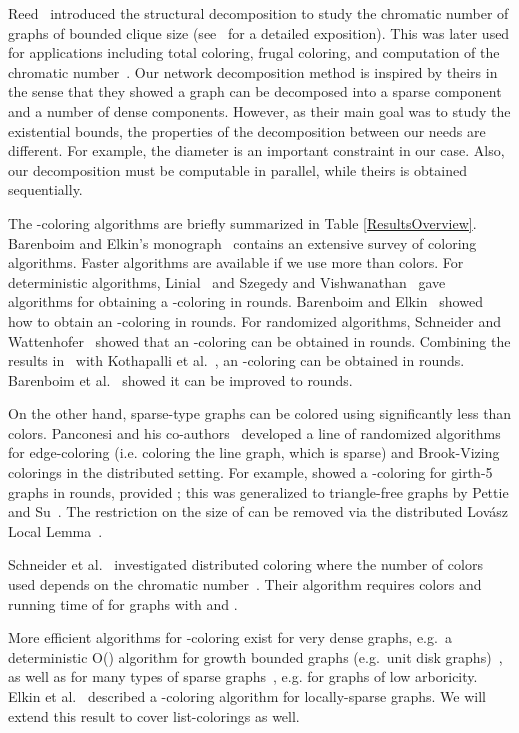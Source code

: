 \documentclass[11pt]{amsart}
\begin{document}
Reed~\cite{ree98} introduced the structural decomposition to study the chromatic number of graphs of bounded clique size (see~\cite{MR01} for a detailed exposition). This was later used for applications including total coloring, frugal coloring, and computation of the chromatic number~\cite{ree99, mol14, mol98, mol10}. Our network decomposition method is inspired by theirs in the sense that they showed a graph can be decomposed into a sparse component and a number of dense components. However, as their main goal was to study the existential bounds, the properties of the decomposition between our needs are different. For example, the diameter is an important constraint in our case. Also, our decomposition must be computable in parallel, while theirs is obtained sequentially.

The -coloring algorithms are briefly summarized in Table \ref{ResultsOverview}. Barenboim and Elkin's monograph~\cite{bar13} contains an extensive survey of coloring algorithms. Faster algorithms are available if we use more than  colors. For deterministic algorithms, Linial~\cite{linial92} and Szegedy and Vishwanathan~\cite{SV93} gave algorithms for obtaining a -coloring in  rounds. Barenboim and Elkin~\cite{elk10} showed how to obtain an -coloring in  rounds. For randomized algorithms, Schneider and Wattenhofer~\cite{Sch10} showed that an -coloring can be obtained in  rounds. Combining the results in~\cite{Sch10} with Kothapalli et al.~\cite{KSOS06}, an -coloring can be obtained in  rounds. Barenboim et al.~\cite{BEPS16} showed it can be improved to  rounds.

On the other hand, sparse-type graphs can be colored using significantly less than  colors. Panconesi and his co-authors~\cite{GP00, DGP98, GP97, PS97} developed a line of randomized algorithms for edge-coloring (i.e. coloring the line graph, which is sparse) and Brook-Vizing colorings in the distributed setting. For example, \cite{GP00} showed a -coloring for girth-5 graphs in  rounds, provided ; this was generalized to triangle-free graphs by Pettie and Su~\cite{PS13}. The restriction on the size of  can be removed via the distributed Lov\'{a}sz Local Lemma~\cite{CPS17}.

Schneider et al.~\cite{sch13} investigated distributed coloring where the number of colors used depends on the chromatic number~. Their algorithm requires  colors and running time of  for graphs with  and .

More efficient algorithms for -coloring exist for very dense graphs, e.g.~a deterministic O() algorithm for growth bounded graphs (e.g.~unit disk graphs)~\cite{sch10opt}, as well as for many types of sparse graphs~\cite{BEPS16,elk15,PS13}, e.g. for graphs of low arboricity. Elkin et al.~\cite{elk15} described a -coloring algorithm for locally-sparse graphs. We will extend this result to cover list-colorings as well.
\end{document}
